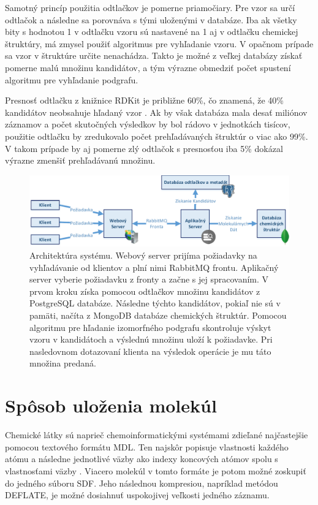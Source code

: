 \documentclass[slovak]{ExcelAtFIT} %
\begin{document}
Samotný princíp použitia odtlačkov je pomerne priamočiary. Pre vzor sa určí odtlačok a následne sa porovnáva s tými uloženými v databáze. Iba ak všetky bity s hodnotou 1 v odtlačku vzoru sú nastavené na 1 aj v odtlačku chemickej štruktúry, má zmysel použiť algoritmus pre vyhľadanie vzoru. V opačnom prípade sa vzor v štruktúre určite nenachádza. Takto je možné z veľkej databázy získať pomerne malú množinu kandidátov, a tým výrazne obmedziť počet spustení algoritmu pre vyhľadanie podgrafu.

Presnosť odtlačku z knižnice RDKit je približne 60\si{\percent}, čo znamená, že 40\si{\percent} kandidátov neobsahuje hľadaný vzor \cite{substruct_acc}. Ak by však databáza mala desať mi\-li\-ó\-nov záznamov a počet skutočných výsledkov by bol rádovo v jednotkách tisícov, použitie odtlačku by zredukovalo počet prehľadávaných štruktúr o viac ako 99\si{\percent}. V takom prípade by aj pomerne zlý odtlačok s presnosťou iba 5\si{\percent} dokázal výrazne zmenšiť prehľadávanú množinu.

\begin{figure}[!htb]
	\centering
	\includegraphics[width=1\linewidth]{images/system.pdf}
	\caption{Architektúra systému. Webový server prijíma požiadavky na vyhľadávanie od klientov a plní nimi RabbitMQ frontu. Aplikačný server vyberie požiadavku z fronty a začne s jej spracovaním. V prvom kroku získa pomocou odtlačkov množinu kandidátov z PostgreSQL databáze. Následne týchto kandidátov, pokiaľ nie sú v pamäti, načíta z MongoDB databáze chemických štruktúr. Pomocou algoritmu pre hľadanie izomorfného podgrafu skontroluje výskyt vzoru v kandidátoch a výslednú množinu uloží k požiadavke. Pri nasledovnom dotazovaní klienta na výsledok operácie je mu táto množina predaná.}
	\label{fig:system}
\end{figure}

\section{Spôsob uloženia molekúl}
\label{sec:storage}
Chemické látky sú naprieč chemoinformatickými sy\-sté\-mami zdieľané najčastejšie pomocou textového for\-má\-tu MDL. Ten najskôr popisuje vlastnosti každého atómu a následne jednotlivé väzby ako indexy koncových atómov spolu s vlastnosťami väzby \cite{mdl}. Viacero molekúl v tomto formáte je potom možné zoskupiť do jedného súboru SDF. Jeho následnou kompresiou, napríklad metódou DEFLATE, je možné dosiahnuť uspokojivej veľkosti jedného záznamu. 
\end{document}
